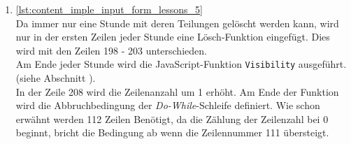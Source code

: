 \begin{enumerate}
	\item \autoref{lst:content_imple_input_form_lessons_5}\\
	Da immer nur eine Stunde mit deren Teilungen gelöscht werden kann, wird nur in der ersten Zeilen jeder Stunde eine Lösch-Funktion eingefügt. Dies wird mit den Zeilen 198 - 203 unterschieden.\\
	Am Ende jeder Stunde wird die JavaScript-Funktion \texttt{Visibility} ausgeführt. (siehe Abschnitt ).\\
	In der Zeile 208 wird die Zeilenanzahl um 1 erhöht. Am Ende der Funktion wird die Abbruchbedingung der \textit{Do-While}-Schleife definiert. Wie schon erwähnt werden 112 Zeilen Benötigt, da die Zählung der Zeilenzahl bei 0 beginnt, bricht die Bedingung ab wenn die Zeilennummer 111 übersteigt.\\
	
	
	
\end{enumerate}

